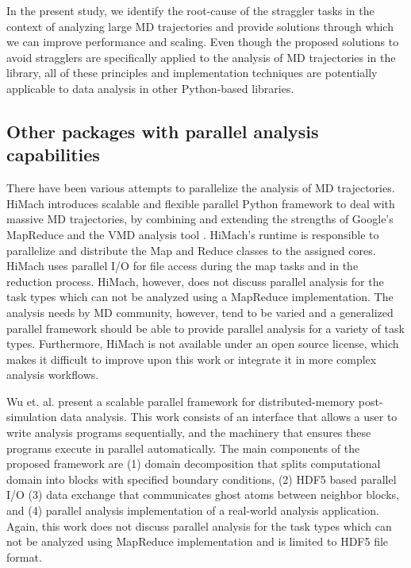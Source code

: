 In the present study, we identify the root-cause of the straggler tasks in the context of analyzing large MD trajectories and provide solutions through which we can improve performance and scaling.
Even though the proposed solutions to avoid stragglers are specifically applied to the analysis of MD trajectories in the  library, all of these principles and implementation techniques are potentially applicable to data analysis in other Python-based libraries.

\subsection{Other packages with parallel analysis capabilities}
\label{sec:otherparallel}

There have been various attempts to parallelize the analysis of MD trajectories. 
HiMach \cite{himach-2008} introduces scalable and flexible parallel Python framework to deal with massive MD trajectories, by combining and extending the strengths of Google's MapReduce and the VMD analysis tool \cite{Hum96}. 
HiMach's runtime is responsible to parallelize and distribute the Map and Reduce classes to the assigned cores.
HiMach uses parallel I/O for file access during the map tasks and  in the reduction process. 
HiMach, however, does not discuss parallel analysis for the task types which can not be analyzed using a MapReduce implementation.
The analysis needs by MD community, however, tend to be varied and a generalized parallel framework should be able to provide parallel analysis for a variety of task types.
Furthermore, HiMach is not available under an open source license, which makes it difficult to improve upon this work or integrate it in more complex analysis workflows.

Wu et. al. \cite{Wu_et.al} present a scalable parallel framework for distributed-memory post-simulation data analysis.
This work consists of an interface that allows a user to write analysis programs sequentially, and the machinery that ensures these programs execute in parallel automatically. 
The main components of the proposed framework are (1) domain decomposition that splits computational domain into blocks with specified boundary conditions, (2) HDF5 based parallel I/O (3) data exchange that communicates ghost atoms between neighbor blocks, and (4) parallel analysis implementation of a real-world analysis application.
Again, this work does not discuss parallel analysis for the task types which can not be analyzed using MapReduce implementation and is limited to HDF5 file format.

